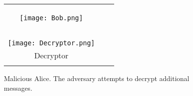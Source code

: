 \documentclass[10pt,journal]{IEEEtran}
\begin{document}
\begin{figure}[!t]
\centering
\begin{tabular}{ccc}
\color{red}
\Ovalbox{\begin{minipage}{0.3\columnwidth}
\centering
Adversary\\
\\

\end{minipage}
}
&  & 
\ovalbox{\begin{minipage}{0.3\columnwidth}
\centering
Encryptor\\
\vspace{0.1cm}
\texttt{[image: Bob.png]}\\

\end{minipage}
}\\
 & & \\
 & & \\
 & & \\
\ovalbox{\begin{minipage}{0.3\columnwidth}
\centering
\\
\vspace{0.1cm}
\texttt{[image: Decryptor.png]}\\
\vspace{-0.1cm}
Decryptor\\
\end{minipage}
}
\end{tabular}
\caption{Malicious Alice. The adversary attempts to decrypt additional messages.}
\label{fig:adversary_alice}
\end{figure}
\end{document}

